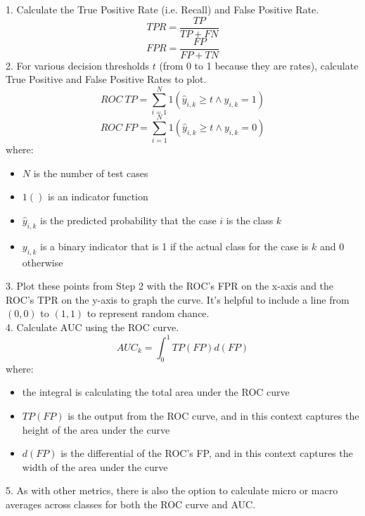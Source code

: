 \documentclass[preview]{standalone}
\begin{document}
1. Calculate the True Positive Rate (i.e. Recall) and False Positive Rate.
{\Large
\[
TPR=\frac{TP}{TP+FN}
\]
}
{\Large
\[
FPR=\frac{FP}{FP+TN}
\]
}
2. For various decision thresholds $t$ (from 0 to 1 because they are rates), calculate True Positive and False Positive Rates to plot.
{\Large
\[
ROC~TP=\sum^N_{i=1}1(\hat{y}_{i,k}\geq t\land y_{i,k}=1)
\]
}
{\Large
\[
ROC~FP=\sum^N_{i=1}1(\hat{y}_{i,k}\geq t\land y_{i,k}=0)
\]
}
where:
\begin{itemize}
	\setlength\itemsep{0.1em}
	\item $N$ is the number of test cases
	\item $1()$ is an indicator function
	\item $\hat{y}_{i,k}$ is the predicted probability that the case $i$ is the class $k$
	\item $y_{i,k}$ is a binary indicator that is 1 if the actual class for the case is $k$ and 0 otherwise
\end{itemize}
3. Plot these points from Step 2 with the ROC's FPR on the x-axis and the ROC's TPR on the y-axis to graph the curve. It's helpful to include a line from $(0,0)$ to $(1,1)$ to represent random chance.\\
4. Calculate AUC using the ROC curve.
{\Large
\[
AUC_k=\int^1_0 TP(FP)d(FP)
\]
}
where:
\begin{itemize}
	\setlength\itemsep{0.1em}
	\item the integral is calculating the total area under the ROC curve
	\item $TP(FP)$ is the output from the ROC curve, and in this context captures the height of the area under the curve
	\item $d(FP)$ is the differential of the ROC's FP, and in this context captures the width of the area under the curve
\end{itemize}
5. As with other metrics, there is also the option to calculate micro or macro averages across classes for both the ROC curve and AUC.
\end{document}
